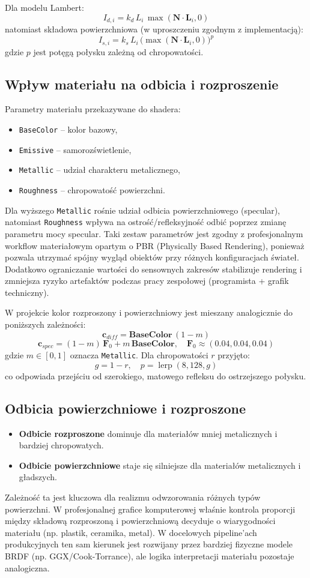 \documentclass[12pt,a4paper]{article}
\begin{document}
Dla modelu Lambert:
\[
I_{d,i} = k_d\,L_i\,\max(\mathbf{N}\cdot\mathbf{L}_i, 0)
\]
natomiast składowa powierzchniowa (w uproszczeniu zgodnym z implementacją):
\[
I_{s,i} = k_s\,L_i\,\big(\max(\mathbf{N}\cdot\mathbf{L}_i, 0)\big)^p
\]
gdzie $p$ jest potęgą połysku zależną od chropowatości.

\subsection{Wpływ materiału na odbicia i rozproszenie}
Parametry materiału przekazywane do shadera:
\begin{itemize}
  \item \texttt{BaseColor} -- kolor bazowy,
  \item \texttt{Emissive} -- samorozświetlenie,
  \item \texttt{Metallic} -- udział charakteru metalicznego,
  \item \texttt{Roughness} -- chropowatość powierzchni.
\end{itemize}
Dla wyższego \texttt{Metallic} rośnie udział odbicia powierzchniowego (specular), natomiast \texttt{Roughness} wpływa na ostrość/refleksyjność odbić poprzez zmianę parametru mocy specular. Taki zestaw parametrów jest zgodny z profesjonalnym workflow materiałowym opartym o PBR (Physically Based Rendering), ponieważ pozwala utrzymać spójny wygląd obiektów przy różnych konfiguracjach świateł. Dodatkowo ograniczanie wartości do sensownych zakresów stabilizuje rendering i zmniejsza ryzyko artefaktów podczas pracy zespołowej (programista + grafik techniczny).

W projekcie kolor rozproszony i powierzchniowy jest mieszany analogicznie do poniższych zależności:
\[
\mathbf{c}_{diff} = \mathbf{BaseColor}\,(1 - m)
\]
\[
\mathbf{c}_{spec} = (1-m)\,\mathbf{F}_0 + m\,\mathbf{BaseColor}, \quad \mathbf{F}_0 \approx (0.04,0.04,0.04)
\]
gdzie $m \in [0,1]$ oznacza \texttt{Metallic}. Dla chropowatości $r$ przyjęto:
\[
g = 1-r, \quad p = \operatorname{lerp}(8,128,g)
\]
co odpowiada przejściu od szerokiego, matowego refleksu do ostrzejszego połysku.

\subsection{Odbicia powierzchniowe i rozproszone}
\begin{itemize}
  \item \textbf{Odbicie rozproszone} dominuje dla materiałów mniej metalicznych i bardziej chropowatych.
  \item \textbf{Odbicie powierzchniowe} staje się silniejsze dla materiałów metalicznych i gładszych.
\end{itemize}
Zależność ta jest kluczowa dla realizmu odwzorowania różnych typów powierzchni. W profesjonalnej grafice komputerowej właśnie kontrola proporcji między składową rozproszoną i powierzchniową decyduje o wiarygodności materiału (np. plastik, ceramika, metal). W docelowych pipeline'ach produkcyjnych ten sam kierunek jest rozwijany przez bardziej fizyczne modele BRDF (np. GGX/Cook-Torrance), ale logika interpretacji materiału pozostaje analogiczna.
\end{document}
